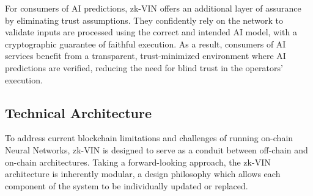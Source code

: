 \documentclass[conference]{IEEEtran}
\begin{document}
For consumers of AI predictions, zk-VIN offers an additional layer of assurance by eliminating trust assumptions. They confidently rely on the network to validate inputs are processed using the correct and intended AI model, with a cryptographic guarantee of faithful execution.  As a result, consumers of AI services benefit from a transparent, trust-minimized environment where AI predictions are verified, reducing the need for blind trust in the operators' execution.

\subsection{Technical Architecture}

To address current blockchain limitations and challenges of running on-chain Neural Networks, zk-VIN is designed to serve as a conduit between off-chain and on-chain architectures. Taking a forward-looking approach, the zk-VIN architecture is inherently modular, a design philosophy which allows each component of the system to be individually updated or replaced.
\end{document}
